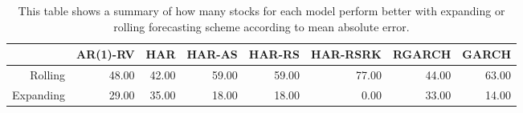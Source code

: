 \begin{table}[ht]
\centering
\begin{tabular}{rrrrrrrr}
  \hline
 & AR(1)-RV & HAR & HAR-AS & HAR-RS & HAR-RSRK & RGARCH & GARCH \\ 
  \hline
Rolling & 48.00 & 42.00 & 59.00 & 59.00 & 77.00 & 44.00 & 63.00 \\ 
  Expanding & 29.00 & 35.00 & 18.00 & 18.00 & 0.00 & 33.00 & 14.00 \\ 
   \hline
\end{tabular}
\caption[Better scheme MAE summary]{This table shows a summary of how many stocks for each model perform better with expanding or rolling forecasting scheme according to mean absolute error. } 
\label{Table:Better_MAE_summary}
\end{table}
